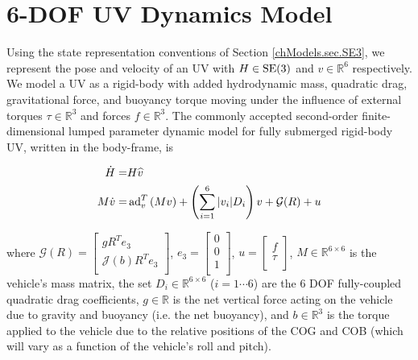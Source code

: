 \section{6-\acs{DOF} \acs{UV} Dynamics Model}
\label{chModels.sec.UVSE3plant}

Using the state representation conventions of Section
\ref{chModels.sec.SE3}, we represent the pose and velocity of an
\ac{UV} with $H\in\SE3$ and $v\in\mathbb{R}^6$ respectively.
%
We model a \ac{UV} as a rigid-body with added hydrodynamic mass,
quadratic drag, gravitational force, and buoyancy torque moving under
the influence of external torques $\tau \in \mathbb{R}^{3}$ and forces
$f \in \mathbb{R}^{3}$.
The commonly accepted second-order finite-dimensional lumped parameter
dynamic model for fully submerged rigid-body \ac{UV}, written in the
body-frame, is

\begin{align} \label{chModels.eq.UVSE3plant}
\dot{H}=&H \widehat{v}
\nonumber \\
  M\dot{v}=&\operatorname{ad}_v^T\left(M v\right)+\left(\sum_{i=1}^6 |v_i|D_i
           \right)v+\mathcal{G}(R)+u 
\end{align}

\noindent where 
%
%
$\mathcal{G}(R)=\left[ \begin{array}{c} g R^T e_3 \\ \mathcal{J}(b)R^T
    e_3 \\ \end{array}\right]$,
$e_3=\left[ \begin{array}{c} 0\\ 0\\
    1\\ \end{array}\right]$, $u=\left[ \begin{array}{c} f \\ \tau
    \\ \end{array}\right]$, $M\in \mathbb{R}^{6 \times 6}$ is the
vehicle's mass matrix, the set $D_i\in \mathbb{R}^{6 \times 6}$
($i=1\cdots6$) are the 6 \ac{DOF} fully-coupled quadratic drag
coefficients, $g\in \mathbb{R}$ is the net vertical force acting on
the vehicle due to gravity and buoyancy (i.e. the net buoyancy), and
$b\in\mathbb{R}^3$ is the torque applied to the vehicle due to the
relative positions of the \ac{COG} and \ac{COB} (which will vary as a
function of the vehicle's roll and pitch)\cite{fossen}.

